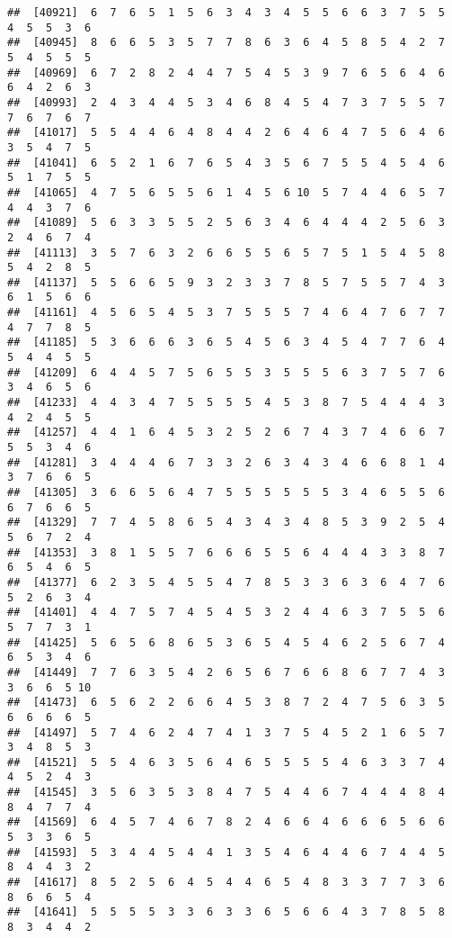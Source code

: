 \documentclass[
]{book}
\begin{document}
\begin{verbatim}
##  [40921]  6  7  6  5  1  5  6  3  4  3  4  5  5  6  6  3  7  5  5  4  5  5  3  6
##  [40945]  8  6  6  5  3  5  7  7  8  6  3  6  4  5  8  5  4  2  7  5  4  5  5  5
##  [40969]  6  7  2  8  2  4  4  7  5  4  5  3  9  7  6  5  6  4  6  6  4  2  6  3
##  [40993]  2  4  3  4  4  5  3  4  6  8  4  5  4  7  3  7  5  5  7  7  6  7  6  7
##  [41017]  5  5  4  4  6  4  8  4  4  2  6  4  6  4  7  5  6  4  6  3  5  4  7  5
##  [41041]  6  5  2  1  6  7  6  5  4  3  5  6  7  5  5  4  5  4  6  5  1  7  5  5
##  [41065]  4  7  5  6  5  5  6  1  4  5  6 10  5  7  4  4  6  5  7  4  4  3  7  6
##  [41089]  5  6  3  3  5  5  2  5  6  3  4  6  4  4  4  2  5  6  3  2  4  6  7  4
##  [41113]  3  5  7  6  3  2  6  6  5  5  6  5  7  5  1  5  4  5  8  5  4  2  8  5
##  [41137]  5  5  6  6  5  9  3  2  3  3  7  8  5  7  5  5  7  4  3  6  1  5  6  6
##  [41161]  4  5  6  5  4  5  3  7  5  5  5  7  4  6  4  7  6  7  7  4  7  7  8  5
##  [41185]  5  3  6  6  6  3  6  5  4  5  6  3  4  5  4  7  7  6  4  5  4  4  5  5
##  [41209]  6  4  4  5  7  5  6  5  5  3  5  5  5  6  3  7  5  7  6  3  4  6  5  6
##  [41233]  4  4  3  4  7  5  5  5  5  4  5  3  8  7  5  4  4  4  3  4  2  4  5  5
##  [41257]  4  4  1  6  4  5  3  2  5  2  6  7  4  3  7  4  6  6  7  5  5  3  4  6
##  [41281]  3  4  4  4  6  7  3  3  2  6  3  4  3  4  6  6  8  1  4  3  7  6  6  5
##  [41305]  3  6  6  5  6  4  7  5  5  5  5  5  5  3  4  6  5  5  6  6  7  6  6  5
##  [41329]  7  7  4  5  8  6  5  4  3  4  3  4  8  5  3  9  2  5  4  5  6  7  2  4
##  [41353]  3  8  1  5  5  7  6  6  6  5  5  6  4  4  4  3  3  8  7  6  5  4  6  5
##  [41377]  6  2  3  5  4  5  5  4  7  8  5  3  3  6  3  6  4  7  6  5  2  6  3  4
##  [41401]  4  4  7  5  7  4  5  4  5  3  2  4  4  6  3  7  5  5  6  5  7  7  3  1
##  [41425]  5  6  5  6  8  6  5  3  6  5  4  5  4  6  2  5  6  7  4  6  5  3  4  6
##  [41449]  7  7  6  3  5  4  2  6  5  6  7  6  6  8  6  7  7  4  3  3  6  6  5 10
##  [41473]  6  5  6  2  2  6  6  4  5  3  8  7  2  4  7  5  6  3  5  6  6  6  6  5
##  [41497]  5  7  4  6  2  4  7  4  1  3  7  5  4  5  2  1  6  5  7  3  4  8  5  3
##  [41521]  5  5  4  6  3  5  6  4  6  5  5  5  5  4  6  3  3  7  4  4  5  2  4  3
##  [41545]  3  5  6  3  5  3  8  4  7  5  4  4  6  7  4  4  4  8  4  8  4  7  7  4
##  [41569]  6  4  5  7  4  6  7  8  2  4  6  6  4  6  6  6  5  6  6  5  3  3  6  5
##  [41593]  5  3  4  4  5  4  4  1  3  5  4  6  4  4  6  7  4  4  5  8  4  4  3  2
##  [41617]  8  5  2  5  6  4  5  4  4  6  5  4  8  3  3  7  7  3  6  8  6  6  5  4
##  [41641]  5  5  5  5  3  3  6  3  3  6  5  6  6  4  3  7  8  5  8  8  3  4  4  2

\end{verbatim}
\end{document}
